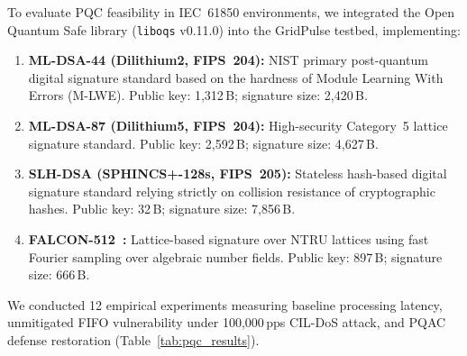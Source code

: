 \documentclass{ieeeaccess}
\begin{document}
To evaluate PQC feasibility in IEC~61850 environments, we integrated the Open Quantum Safe library (\texttt{liboqs} v0.11.0) into the GridPulse testbed, implementing:
\begin{enumerate}[leftmargin=*]
    \item \textbf{ML-DSA-44 (Dilithium2, FIPS~204):} NIST primary post-quantum digital signature standard based on the hardness of Module Learning With Errors (M-LWE). Public key: 1,312\,B; signature size: 2,420\,B.
    \item \textbf{ML-DSA-87 (Dilithium5, FIPS~204):} High-security Category~5 lattice signature standard. Public key: 2,592\,B; signature size: 4,627\,B.
    \item \textbf{SLH-DSA (SPHINCS+-128s, FIPS~205):} Stateless hash-based digital signature standard relying strictly on collision resistance of cryptographic hashes. Public key: 32\,B; signature size: 7,856\,B.
    \item \textbf{FALCON-512~\cite{fouque2018falcon}:} Lattice-based signature over NTRU lattices using fast Fourier sampling over algebraic number fields. Public key: 897\,B; signature size: 666\,B.
\end{enumerate}

We conducted 12 empirical experiments measuring baseline processing latency, unmitigated FIFO vulnerability under 100,000\,pps CIL-DoS attack, and PQAC defense restoration (Table~\ref{tab:pqc_results}).
\end{document}
